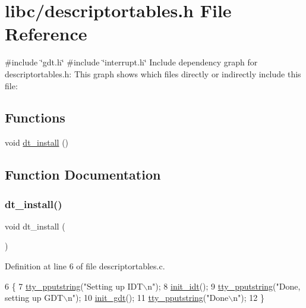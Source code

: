 \hypertarget{a00062}{}\section{libc/descriptortables.h File Reference}
\label{a00062}
{\ttfamily \#include \char`\"{}gdt.\+h\char`\"{}}\newline
{\ttfamily \#include \char`\"{}interrupt.\+h\char`\"{}}\newline
Include dependency graph for descriptortables.\+h\+:
This graph shows which files directly or indirectly include this file\+:
\subsection*{Functions}
\begin{DoxyCompactItemize}
\item 
void \hyperlink{a00062_a4c38e3f3ee100ca4323081bf0970c1ac_a4c38e3f3ee100ca4323081bf0970c1ac}{dt\+\_\+install} ()
\end{DoxyCompactItemize}


\subsection{Function Documentation}
\mbox{\label{a00062_a4c38e3f3ee100ca4323081bf0970c1ac_a4c38e3f3ee100ca4323081bf0970c1ac}} 
\subsubsection{\texorpdfstring{dt\+\_\+install()}{dt\_install()}}
{\footnotesize\ttfamily void dt\+\_\+install (\begin{DoxyParamCaption}{ }\end{DoxyParamCaption})}



Definition at line 6 of file descriptortables.\+c.


\begin{DoxyCode}
6                   \{
7     \hyperlink{a00149_ade960b1320324706aac6c00cc6b1b2fe_ade960b1320324706aac6c00cc6b1b2fe}{tty\_pputstring}(\textcolor{stringliteral}{"Setting up IDT\(\backslash\)n"});
8     \hyperlink{a00095_a35fe413107af682030ab7a4b6dff19b8_a35fe413107af682030ab7a4b6dff19b8}{init\_idt}();
9     \hyperlink{a00149_ade960b1320324706aac6c00cc6b1b2fe_ade960b1320324706aac6c00cc6b1b2fe}{tty\_pputstring}(\textcolor{stringliteral}{"Done, setting up GDT\(\backslash\)n"});
10     \hyperlink{a00089_a86bb50044169930202cc403376ef40c3_a86bb50044169930202cc403376ef40c3}{init\_gdt}();
11     \hyperlink{a00149_ade960b1320324706aac6c00cc6b1b2fe_ade960b1320324706aac6c00cc6b1b2fe}{tty\_pputstring}(\textcolor{stringliteral}{"Done\(\backslash\)n"});
12 \}
\end{DoxyCode}

